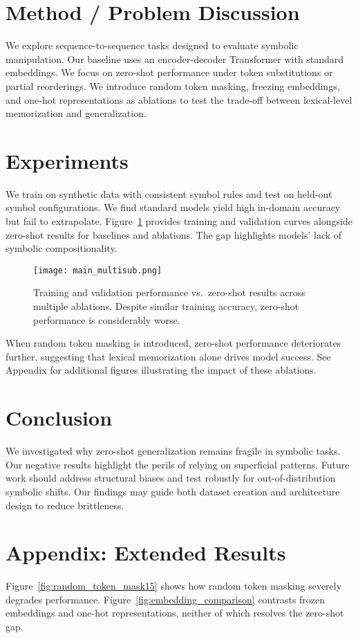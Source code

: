 \documentclass{article}
\begin{document}
\section{Method / Problem Discussion}
We explore sequence-to-sequence tasks designed to evaluate symbolic manipulation. Our baseline uses an encoder-decoder Transformer with standard embeddings. We focus on zero-shot performance under token substitutions or partial reorderings. We introduce random token masking, freezing embeddings, and one-hot representations as ablations to test the trade-off between lexical-level memorization and generalization.

\section{Experiments}
We train on synthetic data with consistent symbol rules and test on held-out symbol configurations. We find standard models yield high in-domain accuracy but fail to extrapolate. Figure~\ref{fig:main_figure} provides training and validation curves alongside zero-shot results for baselines and ablations. The gap highlights models' lack of symbolic compositionality.

\begin{figure}[t]
  \centering
  \texttt{[image: main\_multisub.png]}
  \caption{Training and validation performance vs.\ zero-shot results across multiple ablations. Despite similar training accuracy, zero-shot performance is considerably worse.}
  \label{fig:main_figure}
\end{figure}

When random token masking is introduced, zero-shot performance deteriorates further, suggesting that lexical memorization alone drives model success. See Appendix for additional figures illustrating the impact of these ablations.

\section{Conclusion}
We investigated why zero-shot generalization remains fragile in symbolic tasks. Our negative results highlight the perils of relying on superficial patterns. Future work should address structural biases and test robustly for out-of-distribution symbolic shifts. Our findings may guide both dataset creation and architecture design to reduce brittleness.

\clearpage
\appendix

\section{Appendix: Extended Results}
Figure~\ref{fig:random_token_mask15} shows how random token masking severely degrades performance. Figure~\ref{fig:embedding_comparison} contrasts frozen embeddings and one-hot representations, neither of which resolves the zero-shot gap.
\end{document}

